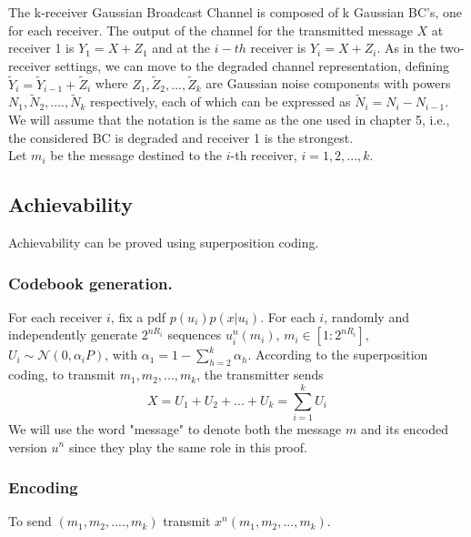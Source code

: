 \renewcommand{\arraystretch}{2}
The k-receiver Gaussian Broadcast Channel is composed of k Gaussian BC's, one for each receiver. The output of the channel for the transmitted message $X$ at receiver 1 is $Y_1 = X+Z_1$ and at the $i-th$ receiver is $Y_i = X+Z_i$. As in the two-receiver settings, we can move to the degraded channel representation, defining $\tilde{Y}_i = \tilde{Y}_{i-1}+\tilde{Z}_i$ where $Z_1,\tilde{Z}_2,...,\tilde{Z}_k$ are Gaussian noise components with powers $N_1,\tilde{N}_2,....,\tilde{N}_k$ respectively, each of which can be expressed as $\tilde{N}_i = N_i-N_{i-1}$. We will assume that the notation is the same as the one used in chapter 5, i.e., the considered BC is degraded and receiver 1 is the strongest. \\
Let $m_i$ be the message destined to the $i$-th receiver, $i=1,2,...,k$.
\subsection{Achievability}
Achievability can be proved using superposition coding.
\subsubsection*{Codebook generation.}
 For each receiver $i$, fix a pdf $p(u_i)p(x|u_i)$. For each $i$, randomly and independently generate $2^{nR_i}$ sequences $u^n_i(m_i)$, $m_i\in [1:2^{nR_i}]$, $U_i\sim \mathcal{N}(0, \alpha_i P)$, with $\alpha_1 = 1-\sum_{h=2}^k \alpha_h$.
According to the superposition coding, to transmit $m_1,m_2,...,m_k$, the transmitter sends
\begin{equation}
X = U_1+ U_2+...+U_k = \sum_{i=1}^k U_i
\end{equation}
We will use the word "message" to denote both the message $m$ and its encoded version $u^n$ since they play the same role in this proof.
\subsubsection*{Encoding}
To send $(m_1,m_2,....,m_k)$ transmit $x^n(m_1,m_2, ...,m_k)$.
